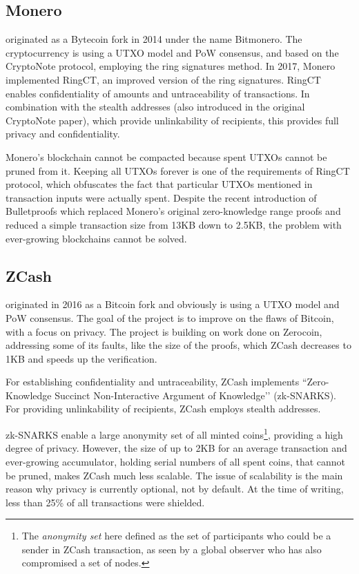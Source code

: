 \documentclass[8pt,fleqn,openany]{book}
\begin{document}
{\subsection{Monero} originated as a Bytecoin fork in 2014 under the name Bitmonero. The cryptocurrency is using a UTXO model and PoW consensus, and based on the CryptoNote protocol\cite{c2}, employing the ring signatures method. In 2017, Monero implemented RingCT\cite{c3}, an improved version of the ring signatures. RingCT enables confidentiality of amounts and untraceability of transactions. In combination with the stealth addresses (also introduced in the original CryptoNote paper), which provide unlinkability of recipients, this provides full privacy and confidentiality.

Monero’s blockchain cannot be compacted because spent UTXOs cannot be pruned from it. Keeping all UTXOs forever is one of the requirements of RingCT protocol, which obfuscates the fact that particular UTXOs mentioned in transaction inputs were actually spent. 
Despite the recent introduction of Bulletproofs\cite{c4} which replaced Monero’s original zero-knowledge range proofs and reduced a simple transaction size from 13KB down to 2.5KB, the problem with ever-growing blockchains cannot be solved. 

\subsection{ZCash} originated in 2016 as a Bitcoin fork and obviously is using a UTXO model and PoW consensus. The goal of the project is to improve on the flaws of Bitcoin, with a focus on privacy. The project is building on work done on Zerocoin\cite{c5}, addressing some of its faults, like the size of the proofs, which ZCash decreases to 1KB and speeds up the verification.

For establishing confidentiality and untraceability, ZCash implements ``Zero-Knowledge Succinct Non-Interactive Argument of Knowledge’’ (zk-SNARKS)\cite{c6}. For providing unlinkability of recipients, ZCash employs stealth addresses.

zk-SNARKS enable a large anonymity set of all minted coins\footnote{The \textit{anonymity set} here defined as the set of participants who could be a sender in ZCash transaction, as seen by a global observer who has also compromised a set of nodes.}, providing a high degree of privacy. However, the size of up to 2KB for an average transaction and ever-growing accumulator, holding serial numbers of all spent coins, that cannot be pruned, makes ZCash much less scalable. The issue of scalability is the main reason why privacy is currently optional, not by default. At the time of writing, less than 25\% of all transactions were shielded.

}
\end{document}
